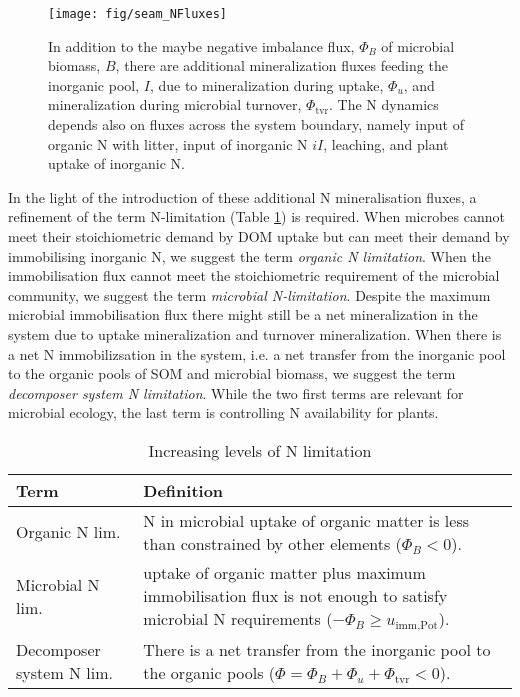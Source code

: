 \begin{figure}[t] \vspace*{2mm}
\begin{center}
\texttt{[image: fig/seam\_NFluxes]} 
\end{center}
\caption{
In addition to the maybe negative imbalance flux, $\Phi_B$ of microbial biomass,
$B$, there are additional mineralization fluxes feeding the inorganic pool, $I$,
due to mineralization during uptake, $\Phi_u$, and mineralization during
microbial turnover, $\Phi_{\operatorname{tvr}}$. The N dynamics depends also on
fluxes across the system boundary, namely input of organic N with litter, input
of inorganic N $iI$, leaching, and plant uptake of inorganic N.
\label{fig:SEAMStructNFluxes}}
\end{figure}

In the light of the introduction of these additional N mineralisation fluxes, a
refinement of the term N-limitation (Table
\ref{tab:NutrientLimDefs}) is required.
When microbes cannot meet their stoichiometric demand by DOM uptake but can
meet their demand by immobilising inorganic N, we suggest the term 
\textit{organic N limitation}.
When the immobilisation flux cannot meet the stoichiometric requirement of the
microbial community, we suggest the term \textit{microbial N-limitation}.
Despite the maximum microbial immobilisation flux there might still be a net
mineralization in the system due to uptake mineralization and turnover
mineralization. When there is a net N
immobilizsation in the system, i.e. a net transfer from the inorganic pool to
the organic pools of SOM and microbial biomass, we suggest the term 
\textit{decomposer system N limitation}. While the two first terms are relevant
for microbial ecology, the last term is controlling N availability for plants.

\begin{table}[t]
\caption{Increasing levels of N limitation \label{tab:NutrientLimDefs}}
\centering
\begin{tabular}{p{2.3cm}p{5.5cm}}
\hline
Term &  Definition \\
\hline
Organic N lim. & N in microbial uptake of organic matter is less than 
constrained by other elements (${\Phi_B < 0}$).
\\
Microbial N lim. & uptake of organic matter plus maximum immobilisation flux is
not enough to satisfy microbial N requirements (${-\Phi_B \ge
u_{\operatorname{imm,Pot}}}$).
\\
Decomposer system N lim. & There is a net transfer from the inorganic pool to
the organic pools (${\Phi = \Phi_B+\Phi_u+\Phi_{\operatorname{tvr}}<0}$).
\\
\hline
\end{tabular}
\end{table}
 

